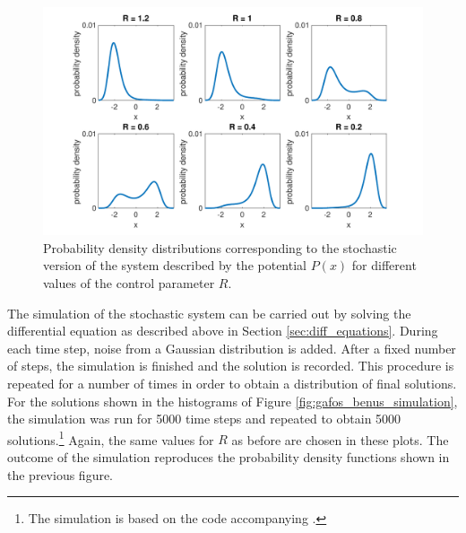 \begin{figure}[hptb]
\begin{center}
\includegraphics[width=\textwidth]{figures/ch3/gafos_benus_probabilities.pdf}
\caption{Probability density distributions corresponding to the stochastic version of the system described by the potential $P(x)$ for different values of the control parameter $R$.}
\label{fig:gafos_benus_probabilities}
\end{center}
\end{figure}

The simulation of the stochastic system can be carried out by solving the differential equation as described above in Section \ref{sec:diff_equations}. During each time step, noise from a Gaussian distribution is added. After a fixed number of steps, the simulation is finished and the solution is recorded. This procedure is repeated for a number of times in order to obtain a distribution of final solutions. For the solutions shown in the histograms of Figure \ref{fig:gafos_benus_simulation}, the simulation was run for 5000 time steps and repeated to obtain 5000 solutions.\footnote{The simulation is based on the code accompanying \citet{Gafos2006}.} Again, the same values for $R$ as before are chosen in these plots. The outcome of the simulation reproduces the probability density functions shown in the previous figure.

